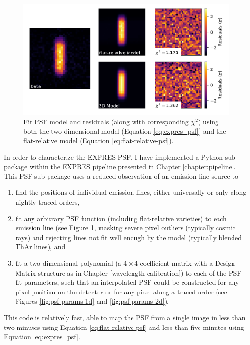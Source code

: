 \begin{figure}
    \centering
    \includegraphics[width=\textwidth]{figures-5/expres-psf.pdf}
    \caption{Fit PSF model and residuals (along with corresponding $\chi^2$) using both the two-dimensional model (Equation \ref{eq:expres_psf}) and the flat-relative model (Equation \ref{eq:flat-relative-psf}).}
    \label{fig:psf-resid}
\end{figure}

In order to characterize the EXPRES PSF, I have implemented a Python sub-package within the EXPRES pipeline presented in Chapter \ref{chapter:pipeline}. This PSF sub-package uses a reduced observation of an emission line source to
\begin{enumerate}
    \item find the positions of individual emission lines, either universally or only along nightly traced orders,
    \item fit any arbitrary PSF function (including flat-relative varieties) to each emission line (see Figure \ref{fig:psf-resid}, masking severe pixel outliers (typically cosmic rays) and rejecting lines not fit well enough by the model (typically blended ThAr lines), and
    \item fit a two-dimensional polynomial (a $4 \times 4$ coefficient matrix with a Design Matrix structure as in Chapter \ref{wavelength-calibration}) to each of the PSF fit parameters, such that an interpolated PSF could be constructed for any pixel-position on the detector or for any pixel along a traced order (see Figures \ref{fig:psf-params-1d} and \ref{fig:psf-params-2d}).
\end{enumerate}
This code is relatively fast, able to map the PSF from a single image in less than two minutes using Equation \ref{eq:flat-relative-psf} and less than five minutes using Equation \ref{eq:expres_psf}.

